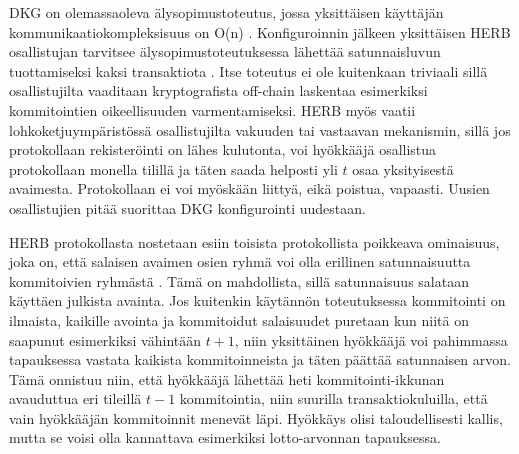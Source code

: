 DKG on olemassaoleva älysopimustoteutus, jossa yksittäisen käyttäjän kommunikaatiokompleksisuus on O(n) \cite{schindler2019ethdkg}. Konfiguroinnin jälkeen yksittäisen HERB osallistujan tarvitsee älysopimustoteutuksessa lähettää satunnaisluvun tuottamiseksi kaksi transaktiota \cite{cherniaeva2019homomorphic}. Itse toteutus ei ole kuitenkaan triviaali sillä osallistujilta vaaditaan kryptografista off-chain laskentaa esimerkiksi kommitointien oikeellisuuden varmentamiseksi. HERB myös vaatii lohkoketjuympäristössä osallistujilta vakuuden tai vastaavan mekanismin, sillä jos protokollaan rekisteröinti on lähes kulutonta, voi hyökkääjä osallistua protokollaan monella tilillä ja täten saada helposti yli $t$ osaa yksityisestä avaimesta. Protokollaan ei voi myöskään liittyä, eikä poistua, vapaasti. Uusien osallistujien pitää suorittaa DKG konfigurointi uudestaan. 

HERB protokollasta nostetaan esiin toisista protokollista poikkeava ominaisuus, joka on, että salaisen avaimen osien ryhmä voi olla erillinen satunnaisuutta kommitoivien ryhmästä \cite{cherniaeva2019homomorphic}. Tämä on mahdollista, sillä satunnaisuus salataan käyttäen julkista avainta. Jos kuitenkin käytännön toteutuksessa kommitointi on ilmaista, kaikille avointa ja kommitoidut salaisuudet puretaan kun niitä on saapunut esimerkiksi vähintään $t+1$, niin yksittäinen hyökkääjä voi pahimmassa tapauksessa vastata kaikista kommitoinneista ja täten päättää satunnaisen arvon. Tämä onnistuu niin, että hyökkääjä lähettää heti kommitointi-ikkunan avauduttua eri tileillä $t-1$ kommitointia, niin suurilla transaktiokuluilla, että vain hyökkääjän kommitoinnit menevät läpi. Hyökkäys olisi taloudellisesti kallis, mutta se voisi olla kannattava esimerkiksi lotto-arvonnan tapauksessa.